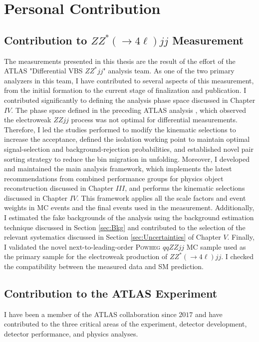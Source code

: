 \section{Personal Contribution}
\label{Appendix:Contribution}
\subsection{Contribution to $ZZ^*(\rightarrow 4\ell)jj$ Measurement} 
\label{subsec:ZZjjContr}

The measurements presented in this thesis are the result of the effort of the ATLAS "Differential VBS $ZZ^*jj$" analysis team. As one of the two primary analyzers in this team, I have contributed to several aspects of this measurement, from the initial formation to the current stage of finalization and publication. I contributed significantly to defining the analysis phase space discussed in Chapter $IV$. The phase space defined in the preceding ATLAS analysis \cite{ATLASZZjj}, which observed the electroweak $ZZjj$ process was not optimal for differential measurements. Therefore, I led the studies performed to modify the kinematic selections to increase the acceptance, defined the isolation working point to maintain optimal signal-selection and background-rejection probabilities, and established novel pair sorting strategy to reduce the bin migration in unfolding. Moreover, I developed and maintained the main analysis framework, which implements the latest recommendations from combined performance groups for physics object reconstruction discussed in Chapter $III$, and performs the kinematic selections discussed in Chapter $IV$. This framework applies all the scale factors and event weights in MC events and the final events used in the measurement. Additionally, I estimated the fake backgrounds of the analysis using the background estimation technique discussed in Section \ref{sec:Bkg} and contributed to the selection of the relevant systematics discussed in Section \ref{sec:Uncertainties} of Chapter $V$. Finally, I validated the novel next-to-leading-order \textsc{Powheg} $qqZZjj$ MC sample used as the primary sample for the electroweak production of $ZZ^*(\rightarrow 4\ell)jj$. I checked the compatibility between the measured data and SM prediction. 

\subsection{Contribution to the ATLAS Experiment}
\label{subsec:ATLASContr}
I have been a member of the ATLAS collaboration since $2017$ and have contributed to the three critical areas of the experiment, detector development, detector performance, and physics analyses.

